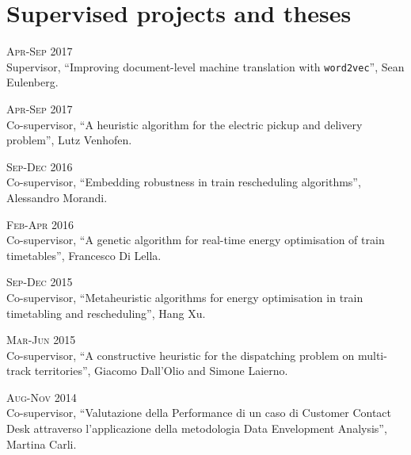 \section*{Supervised projects and theses}

\begin{paracol}{2}
  \textsc{Apr-Sep 2017}
\switchcolumn
  \\
  Supervisor, ``Improving document-level machine translation with \texttt{\scriptsize word2vec}'', Sean Eulenberg.
\end{paracol}

\begin{paracol}{2}
  \textsc{Apr-Sep 2017}
\switchcolumn
  \\
  Co-supervisor, ``A heuristic algorithm for the electric pickup and delivery problem'', Lutz Venhofen.
\end{paracol}

\begin{paracol}{2}
  \textsc{Sep-Dec 2016}
\switchcolumn
  \\
  Co-supervisor, ``Embedding robustness in train rescheduling algorithms'', Alessandro Morandi.
\end{paracol}

\begin{paracol}{2}
  \textsc{Feb-Apr 2016}
\switchcolumn
  \\
  Co-supervisor, ``A genetic algorithm for real-time energy optimisation of train timetables'', Francesco Di Lella.
\end{paracol}

\begin{paracol}{2}
  \textsc{Sep-Dec 2015}
\switchcolumn
  \\
  Co-supervisor, ``Metaheuristic algorithms for energy optimisation in train timetabling and rescheduling'', Hang Xu.
\end{paracol}

\begin{paracol}{2}
  \textsc{Mar-Jun 2015}
\switchcolumn
  \\
  Co-supervisor, ``A constructive heuristic for the dispatching problem on multi-track territories'', Giacomo Dall'Olio and Simone Laierno.
\end{paracol}

\begin{paracol}{2}
  \textsc{Aug-Nov 2014}
\switchcolumn
  \\
  Co-supervisor, ``Valutazione della Performance di un caso di Customer Contact Desk attraverso l'applicazione della metodologia Data Envelopment Analysis'', Martina Carli.
\end{paracol}
